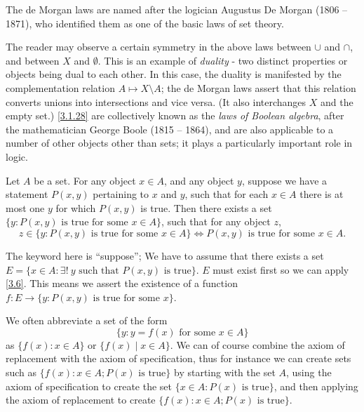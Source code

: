 \begin{remark}\label{3.1.29}
  The de Morgan laws are named after the logician Augustus De Morgan (1806 -- 1871), who identified them as one of the basic laws of set theory.
\end{remark}

\begin{remark}\label{3.1.30}
  The reader may observe a certain symmetry in the above laws between \(\cup\) and \(\cap\), and between \(X\) and \(\emptyset\).
  This is an example of \emph{duality} - two distinct properties or objects being dual to each other.
  In this case, the duality is manifested by the complementation relation \(A \mapsto X \setminus A\);
  the de Morgan laws assert that this relation converts unions into intersections and vice versa.
  (It also interchanges \(X\) and the empty set.)
  \cref{3.1.28} are collectively known as the \emph{laws of Boolean algebra}, after the mathematician George Boole (1815 -- 1864), and are also applicable to a number of other objects other than sets;
  it plays a particularly important role in logic.
\end{remark}

\begin{axiom}[Replacement]\label{3.6}
  Let \(A\) be a set.
  For any object \(x \in A\), and any object \(y\), suppose we have a statement \(P(x, y)\) pertaining to \(x\) and \(y\), such that for each \(x \in A\) there is at most one \(y\) for which \(P(x, y)\) is true.
  Then there exists a set \(\{y : P(x, y) \text{ is true for some } x \in A\}\), such that for any object \(z\),
  \[
    z \in \{y: P(x, y) \text{ is true for some } x \in A\} \iff P(x, y) \text{ is true for some } x \in A.
  \]
\end{axiom}

\begin{note}
  The keyword here is ``suppose'';
  We have to assume that there exists a set \(E = \{x \in A : \exists!\ y \text{ such that } P(x, y) \text{ is true}\}\).
  \(E\) must exist first so we can apply \cref{3.6}.
  This means we assert the existence of a function \(f : E \to \{y : P(x, y) \text{ is true for some } x\}\).
\end{note}

\begin{note}
  We often abbreviate a set of the form
  \[
    \{y : y = f(x) \text{ for some } x \in A\}
  \]
  as \(\{f(x) : x \in A\}\) or \(\{f(x) \mid x \in A\}\).
  We can of course combine the axiom of replacement with the axiom of specification, thus for instance we can create sets such as \(\{f(x) : x \in A; P(x) \text{ is true}\}\) by starting with the set \(A\), using the axiom of specification to create the set \(\{x \in A : P(x) \text{ is true}\}\), and then applying the axiom of replacement to create \(\{f(x) : x \in A; P(x) \text{ is true}\}\).
\end{note}

